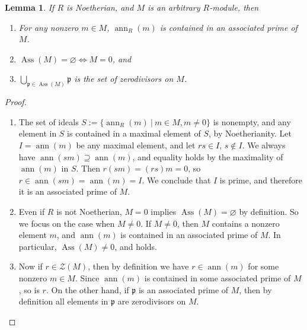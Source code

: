 \documentclass{amsart}[12pt]
\def\Ass{\operatorname{Ass}}
\def\ann{\operatorname{ann}}
\newcommand{\ZZ}{\mathbb{Z}}
\newcommand{\p}{{\mathfrak p}}
\numberwithin{equation}{section}
\theoremstyle{plain} %
\newtheorem{lemma}[equation]{Lemma}
\theoremstyle{definition}
\theoremstyle{remark}
\begin{document}
\begin{lemma}\label{associated primes nonzero}\label{zerodivisors associated primes}
	If $R$ is Noetherian, and $M$ is an arbitrary $R$-module, then 
	\begin{enumerate}
		\item For any nonzero $m \in M$, $\ann_R(m)$ is contained in an associated prime of $M$.
		\item $\Ass(M)= \varnothing \Longleftrightarrow M=0$, and
		\item $\bigcup\limits_{\p \in \Ass(M)} \p$ is the set of zerodivisors on $M$.
	\end{enumerate}
\end{lemma}
\begin{proof}
\begin{enumerate}
\item  The set of ideals $S := \{ \ann_R(m) \ | \ m\in M, m \neq 0\}$ is nonempty, and any element in $S$ is contained in a maximal element of $S$, by Noetherianity. Let $I=\ann(m)$ be any maximal element, and let $rs\in I$, $s\notin I$. We always have $\ann(sm)\supseteq \ann(m)$, and equality holds by the maximality of $\ann(m)$ in $S$. Then $r(sm)=(rs)m=0$, so $r\in \ann(sm)=\ann(m)=I$. We conclude that $I$ is prime, and therefore it is an associated prime of $M$.

\item	Even if $R$ is not Noetherian, $M = 0$ implies $\Ass(M) = \varnothing$ by definition. So we focus on the case when $M \neq 0$.
	 If $M \neq 0$, then $M$ contains a nonzero element $m$, and $\ann(m)$ is contained in an associated prime of $M$. In particular, $\Ass(M) \neq 0$, and holds. 
	 
\item Now if $r \in \mathcal{Z}(M)$, then by definition we have $r \in \ann(m)$ for some nonzero $m \in M$. Since $\ann(m)$ is contained in some associated prime of $M$, so is $r$. On the other hand, if $\p$ is an associated prime of $M$, then by definition all elements in $\p$ are zerodivisors on $M$.\qedhere
\end{enumerate}
\end{proof}
\end{document}
